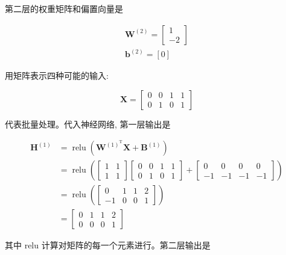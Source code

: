 \documentclass[10pt]{article}
\begin{document}
\begin{CJK*}{UTF8}{bsmi}
第二层的权重矩阵和偏置向量是

$$
\begin{gathered}
\boldsymbol{W}^{(2)}=\left[\begin{array}{r}
1 \\
-2
\end{array}\right] \\
\boldsymbol{b}^{(2)}=[0]
\end{gathered}
$$

用矩阵表示四种可能的输入:

$$
\boldsymbol{X}=\left[\begin{array}{llll}
0 & 0 & 1 & 1 \\
0 & 1 & 0 & 1
\end{array}\right]
$$

代表批量处理。代入神经网络, 第一层输出是

$$
\begin{aligned}
\boldsymbol{H}^{(1)} & =\operatorname{relu}\left(\boldsymbol{W}^{(1)^{\mathrm{T}}} \boldsymbol{X}+\boldsymbol{B}^{(1)}\right) \\
& =\operatorname{relu}\left(\left[\begin{array}{ll}
1 & 1 \\
1 & 1
\end{array}\right]\left[\begin{array}{llll}
0 & 0 & 1 & 1 \\
0 & 1 & 0 & 1
\end{array}\right]+\left[\begin{array}{rrrr}
0 & 0 & 0 & 0 \\
-1 & -1 & -1 & -1
\end{array}\right]\right) \\
& =\operatorname{relu}\left(\left[\begin{array}{llll}
0 & 1 & 1 & 2 \\
-1 & 0 & 0 & 1
\end{array}\right]\right) \\
& =\left[\begin{array}{llll}
0 & 1 & 1 & 2 \\
0 & 0 & 0 & 1
\end{array}\right]
\end{aligned}
$$

其中 relu 计算对矩阵的每一个元素进行。第二层输出是


\end{CJK*}
\end{document}
